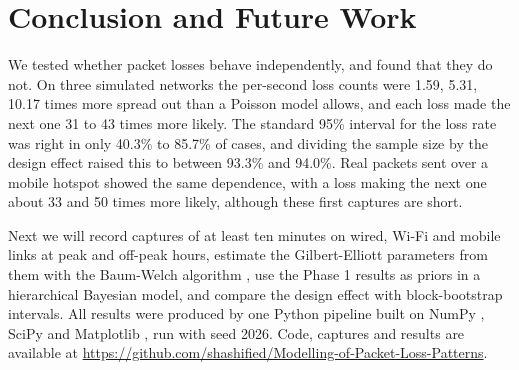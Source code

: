 \documentclass[conference]{IEEEtran}
\begin{document}
\section{Conclusion and Future Work}
We tested whether packet losses behave independently, and found that they do not. On three simulated networks the per-second loss counts were 1.59, 5.31, 10.17 times more spread out than a Poisson model allows, and each loss made the next one 31 to 43 times more likely. The standard 95\% interval for the loss rate was right in only 40.3\% to 85.7\% of cases, and dividing the sample size by the design effect raised this to between 93.3\% and 94.0\%. Real packets sent over a mobile hotspot showed the same dependence, with a loss making the next one about 33 and 50 times more likely, although these first captures are short.

Next we will record captures of at least ten minutes on wired, Wi-Fi and mobile links at peak and off-peak hours, estimate the Gilbert-Elliott parameters from them with the Baum-Welch algorithm \cite{baum1970}, use the Phase 1 results as priors in a hierarchical Bayesian model, and compare the design effect with block-bootstrap intervals. All results were produced by one Python pipeline built on NumPy \cite{numpy2020}, SciPy \cite{scipy2020} and Matplotlib \cite{matplotlib2007}, run with seed 2026. Code, captures and results are available at \url{https://github.com/shashified/Modelling-of-Packet-Loss-Patterns}.
\end{document}
